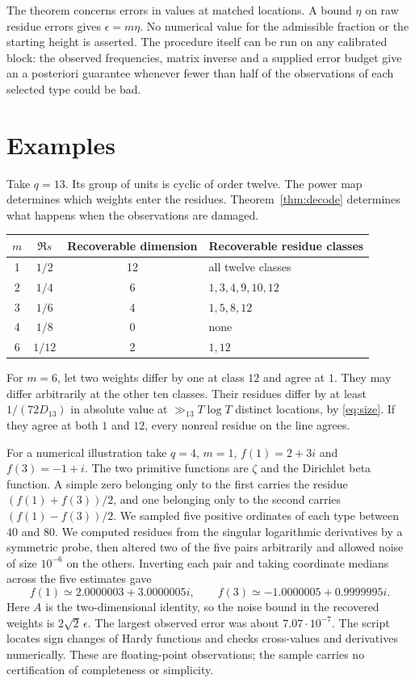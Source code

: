 \documentclass[11pt]{article}
\begin{document}
The theorem concerns errors in values at matched locations. A bound $\eta$ on raw residue errors gives $\epsilon=m\eta$. No numerical value for the admissible fraction or the starting height is asserted. The procedure itself can be run on any calibrated block: the observed frequencies, matrix inverse and a supplied error budget give an a posteriori guarantee whenever fewer than half of the observations of each selected type could be bad.

\section{Examples}
Take $q=13$. Its group of units is cyclic of order twelve. The power map determines which weights enter the residues. Theorem~\ref{thm:decode} determines what happens when the observations are damaged.
\begin{center}
\begin{tabular}{@{}cccl@{}}
\toprule
$m$ & $\Re s$ & Recoverable dimension & Recoverable residue classes\\
\midrule
1 & $1/2$ & 12 & all twelve classes\\
2 & $1/4$ & 6 & $1,3,4,9,10,12$\\
3 & $1/6$ & 4 & $1,5,8,12$\\
4 & $1/8$ & 0 & none\\
6 & $1/12$ & 2 & $1,12$\\
\bottomrule
\end{tabular}
\end{center}
For $m=6$, let two weights differ by one at class $12$ and agree at $1$. They may differ arbitrarily at the other ten classes. Their residues differ by at least $1/(72D_{13})$ in absolute value at $\gg_{13}T\log T$ distinct locations, by \eqref{eq:size}. If they agree at both $1$ and $12$, every nonreal residue on the line agrees.

For a numerical illustration take $q=4$, $m=1$, $f(1)=2+3i$ and $f(3)=-1+i$. The two primitive functions are $\zeta$ and the Dirichlet beta function. A simple zero belonging only to the first carries the residue $(f(1)+f(3))/2$, and one belonging only to the second carries $(f(1)-f(3))/2$. We sampled five positive ordinates of each type between $40$ and $80$. We computed residues from the singular logarithmic derivatives by a symmetric probe, then altered two of the five pairs arbitrarily and allowed noise of size $10^{-6}$ on the others. Inverting each pair and taking coordinate medians across the five estimates gave
\[
 f(1)\simeq 2.0000003+3.0000005i,\qquad
 f(3)\simeq-1.0000005+0.9999995i.
\]
Here $A$ is the two-dimensional identity, so the noise bound in the recovered weights is $2\sqrt2\,\epsilon$. The largest observed error was about $7.07\cdot10^{-7}$. The script locates sign changes of Hardy functions and checks cross-values and derivatives numerically. These are floating-point observations; the sample carries no certification of completeness or simplicity.
\end{document}
